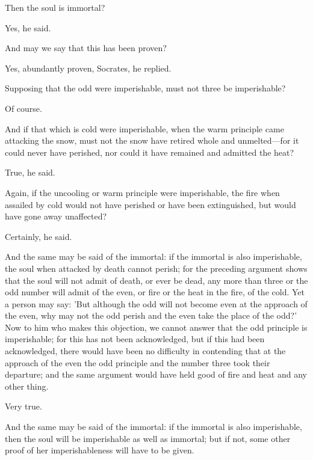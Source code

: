 \documentclass[11pt,letter]{article}
\begin{document}
\par  Then the soul is immortal?

\par  Yes, he said.

\par  And may we say that this has been proven?

\par  Yes, abundantly proven, Socrates, he replied.

\par  Supposing that the odd were imperishable, must not three be imperishable?

\par  Of course.

\par  And if that which is cold were imperishable, when the warm principle came attacking the snow, must not the snow have retired whole and unmelted—for it could never have perished, nor could it have remained and admitted the heat?

\par  True, he said.

\par  Again, if the uncooling or warm principle were imperishable, the fire when assailed by cold would not have perished or have been extinguished, but would have gone away unaffected?

\par  Certainly, he said.

\par  And the same may be said of the immortal: if the immortal is also imperishable, the soul when attacked by death cannot perish; for the preceding argument shows that the soul will not admit of death, or ever be dead, any more than three or the odd number will admit of the even, or fire or the heat in the fire, of the cold. Yet a person may say: 'But although the odd will not become even at the approach of the even, why may not the odd perish and the even take the place of the odd?' Now to him who makes this objection, we cannot answer that the odd principle is imperishable; for this has not been acknowledged, but if this had been acknowledged, there would have been no difficulty in contending that at the approach of the even the odd principle and the number three took their departure; and the same argument would have held good of fire and heat and any other thing.

\par  Very true.

\par  And the same may be said of the immortal: if the immortal is also imperishable, then the soul will be imperishable as well as immortal; but if not, some other proof of her imperishableness will have to be given.
\end{document}
